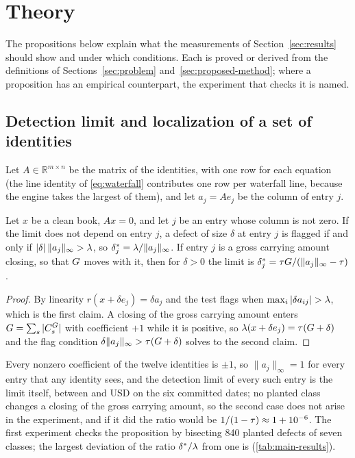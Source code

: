 \section{Theory}
\label{sec:theory}

The propositions below explain what the measurements of Section~\ref{sec:results} should show and under which conditions.
Each is proved or derived from the definitions of Sections~\ref{sec:problem} and~\ref{sec:proposed-method}; where a proposition has an empirical counterpart, the experiment that checks it is named.

\subsection{Detection limit and localization of a set of identities}
\label{sec:theory-detection}

Let $A\in\mathbb{R}^{m\times n}$ be the matrix of the identities, with one row for each equation (the line identity of \eqref{eq:waterfall} contributes one row per waterfall line, because the engine takes the largest of them), and let $a_j=Ae_j$ be the column of entry $j$.

\begin{proposition}
\label{prop:limit}
Let $x$ be a clean book, $Ax=0$, and let $j$ be an entry whose column is not zero. If the limit does not depend on entry $j$, a defect of size $\delta$ at entry $j$ is flagged if and only if $|\delta|\,\|a_j\|_\infty>\lambda$, so $\delta^{*}_j=\lambda/\|a_j\|_\infty$. If entry $j$ is a gross carrying amount closing, so that $G$ moves with it, then for $\delta>0$ the limit is $\delta^{*}_j=\tau G/(\|a_j\|_\infty-\tau)$.
\end{proposition}

\begin{proof}
By linearity $r(x+\delta e_j)=\delta a_j$ and the test flags when $\max_i|\delta a_{ij}|>\tlim$, which is the first claim. A closing of the gross carrying amount enters $G=\sum_s|C^{G}_s|$ with coefficient $+1$ while it is positive, so $\lambda(x+\delta e_j)=\tau(G+\delta)$ and the flag condition $\delta\|a_j\|_\infty>\tau(G+\delta)$ solves to the second claim.
\end{proof}

Every nonzero coefficient of the twelve identities is $\pm1$, so $\|a_j\|_\infty=1$ for every entry that any identity sees, and the detection limit of every such entry is the limit itself, between \eoneCleanLimitLow{} and \eoneCleanLimitHigh{} USD on the six committed dates; no planted class changes a closing of the gross carrying amount, so the second case does not arise in the experiment, and if it did the ratio would be $1/(1-\tau)\approx1+10^{-6}$.
The first experiment checks the proposition by bisecting 840 planted defects of seven classes; the largest deviation of the ratio $\delta^{*}/\lambda$ from one is \eoneThrDev{} (\cref{tab:main-results}).

